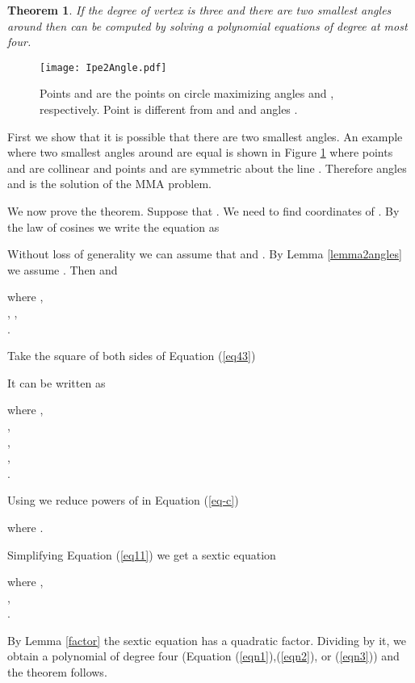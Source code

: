 \documentclass[10pt]{article}
\newtheorem{thm}[theorem]{Theorem}
\newenvironment{proof}{\begingroup\Proof}{\qed\endgroup}
\def\Proof{\noindent{\bf Proof\/:}\nobreak}
\def\qed{\unskip~{\vrule height 4pt depth 0pt width 4pt}\medbreak}
\begin{document}
\begin{thm} \label{thm2angles}
If the degree of vertex  is three and there are two smallest angles around  then  can be computed by solving a polynomial equations of degree at most four.
\end{thm}


\begin{figure}[htp]
\centering
\texttt{[image: Ipe2Angle.pdf]}
\caption{
Points  and  are the points on circle  maximizing angles  and , respectively. Point  is different from  and  and angles .}
\label{Ipe2Angle}
\end{figure}

\begin{proof}
First we show that it is possible that there are two smallest angles. 
An example where two smallest angles around  are equal is shown in Figure  \ref{Ipe2Angle} where points  and  are collinear and 
points  and  are symmetric about the line .
Therefore angles  and  is the solution of the MMA problem.

We now prove the theorem. Suppose that . 
We need to find coordinates of .
By the law of cosines we write the equation  as



Without loss of generality we can assume that  and . 
By Lemma \ref{lemma2angles} we assume . 
Then  and

where ,\\
, 
,\\ .

Take the square of both sides of Equation (\ref{eq43})

It can be written as

where , \\
,\\
, \\
,\\
.

Using  we reduce powers of  in Equation (\ref{eq-c})

where
.



Simplifying Equation (\ref{eq11}) we get a sextic equation


where
,\\
,\\ 
.

By Lemma \ref{factor} the sextic equation has a quadratic factor. 
Dividing by it, we obtain a polynomial of degree four (Equation (\ref{eqn1}),(\ref{eqn2}), or
(\ref{eqn3})) and the theorem follows.
\end{proof}
\end{document}
